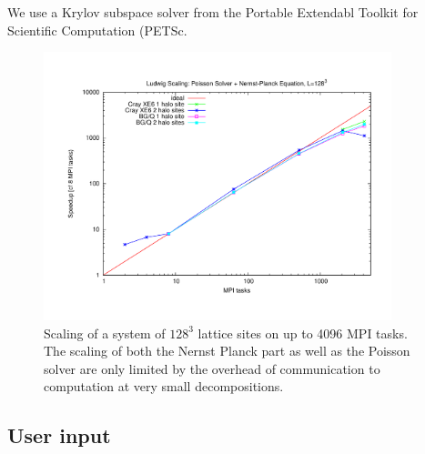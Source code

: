 We use a Krylov subspace solver from the Portable Extendabl Toolkit for Scientific Computation (PETSc. 

\begin{figure}[htpb]
\includegraphics[width=0.9\textwidth]{./pics/petsc_scaling.pdf}
\caption{Scaling of a system of $128^3$ lattice sites on up to 4096 MPI tasks. 
The scaling of both the Nernst Planck part as well as the Poisson solver are only limited by the overhead of communication to computation at very small decompositions.} 
\label{fig6} 
\end{figure}
\clearpage


\subsection{User input}
